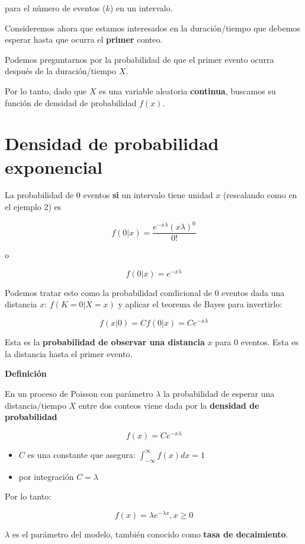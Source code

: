 \documentclass[
]{book}
\begin{document}
para el número de eventos (\(k\)) en un intervalo.

Consideremos ahora que estamos interesados en la duración/tiempo que debemos esperar hasta que ocurra el \textbf{primer} conteo.

Podemos preguntarnos por la probabilidad de que el primer evento ocurra después de la duración/tiempo \(X\).

Por lo tanto, dado que \(X\) es una variable aleatoria \textbf{continua}, buscamos su función de densidad de probabilidad \(f(x)\).

\hypertarget{densidad-de-probabilidad-exponencial}{%
\section{Densidad de probabilidad exponencial}\label{densidad-de-probabilidad-exponencial}}

La probabilidad de \(0\) eventos \textbf{si} un intervalo tiene unidad \(x\) (rescalando como en el ejemplo 2) es

\[f(0|x)=\frac{e^{-x\lambda}(x\lambda)^0}{0!}\]

o

\[f(0|x)=e^{-x\lambda}\]

Podemos tratar esto como la probabilidad condicional de \(0\) eventos dada una distancia \(x\): \(f(K=0|X=x)\) y aplicar el teorema de Bayes para invertirlo:

\[f(x|0)=C f(0|x)=C e^{-x\lambda}\]

Esta es la \textbf{probabilidad de observar una distancia} \(x\) para \(0\) eventos. Esta es la distancia hasta el primer evento.

\textbf{Definición}

En un proceso de Poisson con parámetro \(\lambda\) la probabilidad de esperar una distancia/tiempo \(X\) entre dos conteos viene dada por la \textbf{densidad de probabilidad}

\[f(x)= C e^{-x\lambda}\]

\begin{itemize}
\item
  \(C\) es una constante que asegura: \(\int_{-\infty}^{\infty} f(x) dx =1\)
\item
  por integración \(C=\lambda\)
\end{itemize}

Por lo tanto:

\[f(x)=\lambda e^{-\lambda x}, x\geq 0\]

\(\lambda\) es el parámetro del modelo, también conocido como \textbf{tasa de decaimiento}.
\end{document}
